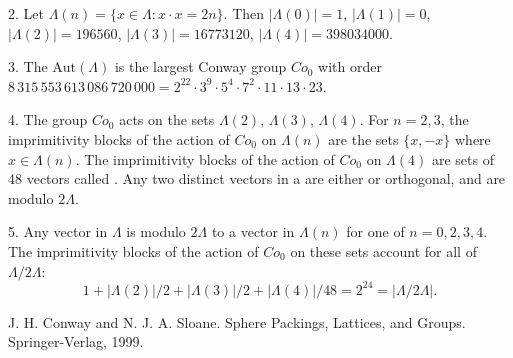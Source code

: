 \documentclass[12pt]{article}
\begin{document}
2. Let $\Lambda(n) = \{x \in \Lambda: x \cdot x = 2n \}$.  Then $|\Lambda(0)| = 1$, $|\Lambda(1)| = 0$, $|\Lambda(2)| = 196560$, $|\Lambda(3)| = 16773120$, $|\Lambda(4)| = 398034000$.

3. The  $\mbox{Aut}(\Lambda)$ is the largest Conway group $Co_0$ with order $8\,315\,553\,613\,086\,720\,000 = 2^{22} \cdot 3^9 \cdot 5^4 \cdot 7^2 \cdot 11 \cdot 13 \cdot 23$. 

4. The group $Co_0$ acts  on the sets $\Lambda(2)$, $\Lambda(3)$, $\Lambda(4)$.  For $n=2,3$, the imprimitivity blocks of the action of $Co_0$ on $\Lambda(n)$ are the sets $\{x, -x\}$ where $x \in \Lambda(n)$.  The imprimitivity blocks of the action of $Co_0$ on $\Lambda(4)$ are sets of 48 vectors called \emph{}.  Any two distinct vectors in a  are either  or orthogonal, and are  modulo $2\Lambda$.

5. Any vector in $\Lambda$ is  modulo $2\Lambda$ to a vector in $\Lambda(n)$ for one of $n = 0,2,3,4$.  The imprimitivity blocks of the action of $Co_0$ on these sets account for all  of $\Lambda / 2 \Lambda$: $$1 + |\Lambda(2)|/2 + |\Lambda(3)|/2 + |\Lambda(4)|/48 = 2^{24} = |\Lambda / 2 \Lambda|.$$ 





\begin{thebibliography}{9}
 J. H. Conway and N. J. A. Sloane. Sphere Packings, Lattices, and Groups. Springer-Verlag, 1999.
\end{thebibliography}

\end{document}
